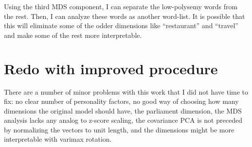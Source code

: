 Using the third MDS component, I can separate the low-polysemy words from the 
rest. Then, I can analyze these words as another word-list. It is possible
that this will eliminate some of the odder dimensions like ``restaurant'' and
``travel'' and make some of the rest more interpretable.

\section{Redo with improved procedure}

There are a number of minor problems with this work that I did not have time to
fix: no clear number of personality factors, no good way of choosing how many 
dimensions the original model should have, the parliament dimension, the 
MDS analysis lacks any analog to z-score scaling, the covariance PCA is not
preceded by normalizing the vectors to unit length, and the dimensions might
be more interpretable with varimax rotation.

